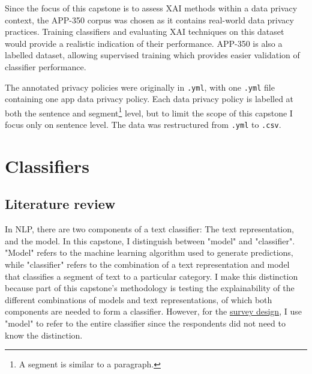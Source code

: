 Since the focus of this capstone is to assess XAI methods within a data privacy context, the APP-350 corpus was chosen as it contains real-world data privacy practices. Training classifiers and evaluating XAI techniques on this dataset would provide a realistic indication of their performance. APP-350 is also a labelled dataset, allowing supervised training which provides easier validation of classifier performance. 

The annotated privacy policies were originally in \texttt{.yml}, with one \texttt{.yml} file containing one app data privacy policy. Each data privacy policy is labelled at both the sentence and segment\footnote{A segment is similar to a paragraph.} level, but to limit the scope of this capstone I focus only on sentence level. The data was restructured from \texttt{.yml} to \texttt{.csv}.

\section{Classifiers}
\label{sec:classifiers}
\subsection{Literature review}
In NLP, there are two components of a text classifier: The text representation, and the model. In this capstone, I distinguish between "model" and "classifier". "Model" refers to the machine learning algorithm used to generate predictions, while "classifier" refers to the combination of a text representation and model that classifies a segment of text to a particular category. I make this distinction because part of this capstone's methodology is testing the explainability of the different combinations of models and text representations, of which both components are needed to form a classifier. However, for the \hyperref[sec:survey_method]{survey design}, I use "model" to refer to the entire classifier since the respondents did not need to know the distinction.

